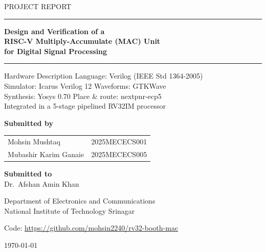 \documentclass[11pt,a4paper]{report}
\begin{document}

\begin{titlepage}
  \centering
  \vspace*{1.5cm}
  {\Large PROJECT REPORT\par}
  \vspace{1.2cm}
  {\color{accent}\rule{\linewidth}{1.2pt}\par}
  \vspace{0.4cm}
  {\huge\bfseries Design and Verification of a\\[4pt]
   RISC-V Multiply-Accumulate (MAC) Unit\\[4pt]
   for Digital Signal Processing\par}
  \vspace{0.4cm}
  {\color{accent}\rule{\linewidth}{1.2pt}\par}
  \vspace{1.5cm}
  {\large Hardware Description Language: Verilog (IEEE Std 1364-2005)\\
   Simulator: Icarus Verilog 12 \quad Waveforms: GTKWave\\
   Synthesis: Yosys 0.70 \quad Place \& route: nextpnr-ecp5\\
   Integrated in a 5-stage pipelined RV32IM processor\par}
  \vspace{2.2cm}
  {\large\textbf{Submitted by}\par}
  \vspace{6pt}
  {\large
   \begin{tabular}{@{}l@{\qquad}l@{}}
     Mohsin Mushtaq        & 2025MECECS001 \\
     Mubashir Karim Ganaie & 2025MECECS005 \\
   \end{tabular}\par}
  \vspace{1.2cm}
  {\large\textbf{Submitted to}\\[6pt]
   Dr.~Afshan Amin Khan\par}
  \vspace{1.6cm}
  {\large Department of Electronics and Communications\\[2pt]
   National Institute of Technology Srinagar\par}
  \vspace{0.8cm}
  {\normalsize Code: \url{https://github.com/mohsin2240/rv32-booth-mac}\par}
  \vfill
  {\large \today\par}
\end{titlepage}
\end{document}
